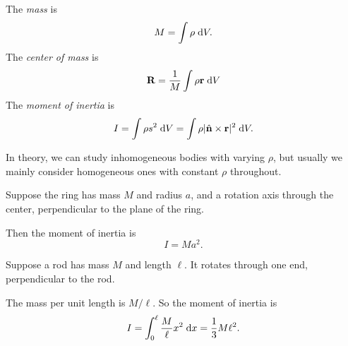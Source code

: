 \documentclass[a4paper]{article}
\begin{document}
\begin{defi}
  The \emph{mass} is
  \[
    M = \int \rho \;\mathrm{d} V.
  \]
  The \emph{center of mass} is
  \[
    \mathbf{R} = \frac{1}{M}\int \rho  \mathbf{r}\;\mathrm{d} V
  \]
  The \emph{moment of inertia} is
  \[
    I = \int \rho s^2 \;\mathrm{d} V = \int \rho|\hat{\mathbf{n}}\times \mathbf{r}|^2\;\mathrm{d} V.
  \]
\end{defi}
In theory, we can study inhomogeneous bodies with varying $\rho$, but usually we mainly consider homogeneous ones with constant $\rho$ throughout.

\begin{eg}
  Suppose the ring has mass $M$ and radius $a$, and a rotation axis through the center, perpendicular to the plane of the ring.
  \begin{center}
  \end{center}
  Then the moment of inertia is
  \[
    I = Ma^2.
  \]
\end{eg}

\begin{eg}
  Suppose a rod has mass $M$ and length $\ell$. It rotates through one end, perpendicular to the rod.

  \begin{center}
  \end{center}
  The mass per unit length is $M/\ell$. So the moment of inertia is
  \[
    I = \int_0 ^\ell \frac{M}{\ell}x^2\;\mathrm{d} x = \frac{1}{3}M\ell^2.
  \]
\end{eg}
\end{document}
